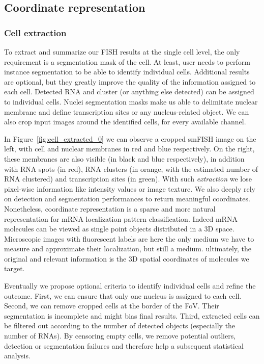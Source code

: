 \subsection{Coordinate representation}
\label{subsec:coordinate_representation}

\subsubsection{Cell extraction}

To extract and summarize our \ac{FISH} results at the single cell level, the only requirement is a segmentation mask of the cell.
At least, user needs to perform instance segmentation to be able to identify individual cells.
Additional results are optional, but they greatly improve the quality of the information assigned to each cell.
Detected \ac{RNA} and cluster (or anything else detected) can be assigned to individual cells.
Nuclei segmentation masks make us able to delimitate nuclear membrane and define transcription sites or any nucleus-related object.
We can also crop input images around the identified cells, for every available channel.

In Figure~\ref{fig:cell_extracted_0} we can observe a cropped \ac{smFISH} image on the left, with cell and nuclear membranes in red and blue respectively.
On the right, these membranes are also visible (in black and blue respectively), in addition with \ac{RNA} spots (in red), \ac{RNA} clusters (in orange, with the estimated number of \ac{RNA} clustered) and transcription sites (in green).
With such \emph{extraction} we lose pixel-wise information like intensity values or image texture.
We also deeply rely on detection and segmentation performances to return meaningful coordinates.
Nonetheless, coordinate representation is a sparse and more natural representation for \ac{mRNA} localization pattern classification.
Indeed \ac{mRNA} molecules can be viewed as single point objects distributed in a 3D space.
Microscopic images with fluorescent labels are here the only medium we have to measure and approximate their localization, but still a medium.
ultimately, the original and relevant information is the 3D spatial coordinates of molecules we target.

Eventually we propose optional criteria to identify individual cells and refine the outcome.
First, we can ensure that only one nucleus is assigned to each cell.
Second, we can remove cropped cells at the border of the \ac{FoV}.
Their segmentation is incomplete and might bias final results.
Third, extracted cells can be filtered out according to the number of detected objects (especially the number of \ac{RNA}s).
By censoring empty cells, we remove potential outliers, detection or segmentation failures and therefore help a subsequent statistical analysis.\\

